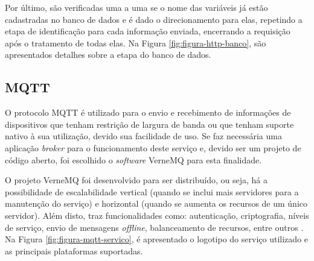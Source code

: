    	Por último, são verificadas uma a uma se o nome das variáveis já estão cadastradas no banco de dados e é dado o direcionamento para elas, repetindo a etapa de identificação para cada informação enviada, encerrando a requisição após o tratamento de todas elas. Na Figura \ref{fig:figura-http-banco}, são apresentados detalhes sobre a etapa do banco de dados.
    	
    	\begin{figure}[!h]
    	\end{figure}
        
        \subsection{MQTT}
        \label{sec:aquisicao-mqtt}
        O protocolo \gls{MQTT} é utilizado para o envio e recebimento de informações de dispositivos que tenham restrição de largura de banda ou que tenham suporte nativo à sua utilização, devido sua facilidade de uso. Se faz necessária uma aplicação \textit{broker} para o funcionamento deste serviço e, devido ser um projeto de código aberto, foi escolhido o \textit{software} VerneMQ para esta finalidade.
        
        O projeto VerneMQ foi desenvolvido para ser distribuído, ou seja, há a possibilidade de escalabilidade vertical (quando se inclui mais servidores para a manutenção do serviço) e horizontal (quando se aumenta os recursos de um único servidor). Além disto, traz funcionalidades como: autenticação, criptografia, níveis de serviço, envio de mensagens \textit{offline}, balanceamento de recursos, entre outros \cite{VerneMQ}. Na Figura \ref{fig:figura-mqtt-servico}, é apresentado o logotipo do serviço utilizado e as principais plataformas suportadas.
        
